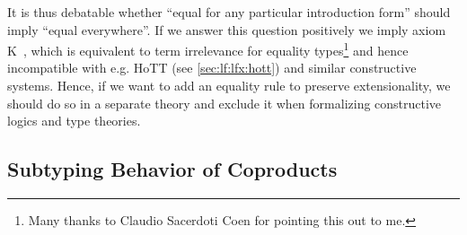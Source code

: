 \begin{itemize}
	It is thus debatable whether ``equal for any particular introduction form'' should imply ``equal everywhere''. If we answer this question positively we imply axiom K~\cite{axiomk}, which is equivalent to term irrelevance for equality types\footnote{Many thanks to Claudio Sacerdoti Coen for pointing this out to me.} and hence incompatible with e.g. HoTT (see \autoref{sec:lf:lfx:hott}) and similar constructive systems. Hence, if we want to add an equality rule to preserve extensionality, we should do so in a separate theory and exclude it when formalizing constructive logics and type theories.
	 
	
%	
%	
\end{itemize}

\subsection{Subtyping Behavior of Coproducts}

